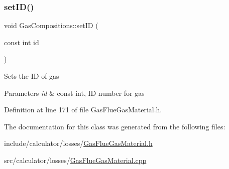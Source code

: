 \subsubsection{\texorpdfstring{set\+I\+D()}{setID()}}
{\footnotesize\ttfamily void Gas\+Compositions\+::set\+ID (\begin{DoxyParamCaption}\item[{const int}]{id }\end{DoxyParamCaption})\hspace{0.3cm}{\ttfamily [inline]}}

Sets the ID of gas


\begin{DoxyParams}{Parameters}
{\em id} & const int, ID number for gas \\
\hline
\end{DoxyParams}


Definition at line 171 of file Gas\+Flue\+Gas\+Material.\+h.



The documentation for this class was generated from the following files\+:\begin{DoxyCompactItemize}
\item 
include/calculator/losses/\hyperlink{_gas_flue_gas_material_8h}{Gas\+Flue\+Gas\+Material.\+h}\item 
src/calculator/losses/\hyperlink{_gas_flue_gas_material_8cpp}{Gas\+Flue\+Gas\+Material.\+cpp}\end{DoxyCompactItemize}
